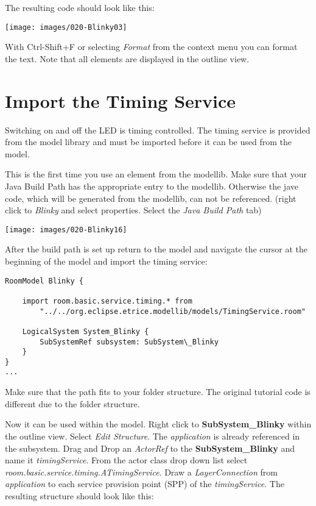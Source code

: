 The resulting code should look like this:

\texttt{[image: images/020-Blinky03]}

With Ctrl-Shift+F or selecting \textit{Format} from the context menu you can format the text. Note that all elements are displayed in the outline view.

\section{Import the Timing Service}

Switching on and off the LED is timing controlled. The timing service is provided from the model library and must be imported before it can be used from the model.

This is the first time you use an element from the modellib. Make sure that your Java Build Path has the appropriate entry to the modellib. Otherwise the jave code, which will be generated from the modellib, can not be referenced.
(right click to \textit{Blinky} and select properties. Select the \textit{Java Build Path} tab) 
  
\texttt{[image: images/020-Blinky16]}

After the build path is set up return to the model and navigate the cursor at the beginning of the model and import the timing service: 

\begin{small}
\begin{verbatim}
RoomModel Blinky {
    
    import room.basic.service.timing.* from 
		"../../org.eclipse.etrice.modellib/models/TimingService.room" 
    
    LogicalSystem System_Blinky {
        SubSystemRef subsystem: SubSystem\_Blinky
    }
}
...     
\end{verbatim}
\end{small}

Make sure that the path fits to your folder structure. The original tutorial code is different due to the folder structure.  

Now it can be used within the model. Right click to \textbf{SubSystem\_Blinky} within the outline view. Select \textit{Edit Structure}. The \textit{application} is already referenced in the subsystem. Drag and Drop an \textit{ActorRef} to the \textbf{SubSystem\_Blinky} and name it \textit{timingService}. From the actor class drop down list select \textit{room.basic.service.timing.ATimingService}. Draw a \textit{LayerConnection} from \textit{application} to each service provision point (SPP) of the \textit{timingService}. The resulting structure should look like this:

